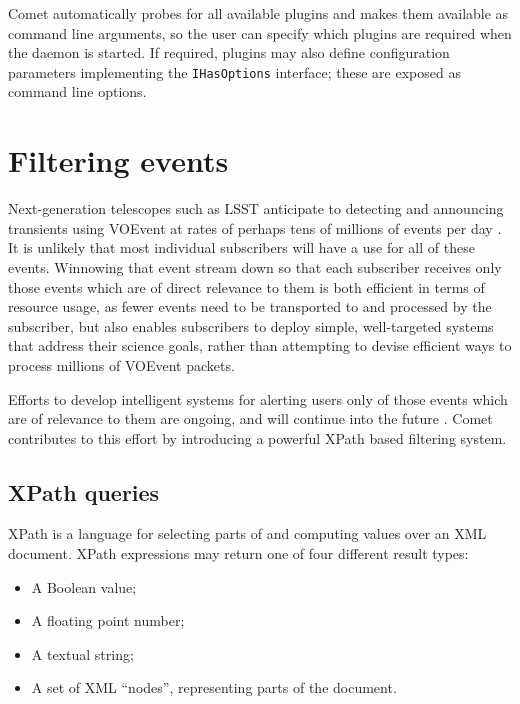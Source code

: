 \documentclass[5p,authoryear]{elsarticle}
\begin{document}
Comet automatically probes for all available plugins and makes them available
as command line arguments, so the user can specify which plugins are required
when the daemon is started. If required, plugins may also define configuration
parameters implementing the \texttt{IHasOptions} interface; these are exposed
as command line options.

\section{Filtering events}
\label{sec:filter}

Next-generation telescopes such as LSST anticipate to detecting and announcing
transients using VOEvent at rates of perhaps tens of millions of events per
day \citep{Kantor:2014}. It is unlikely that most individual subscribers will
have a use for all of these events. Winnowing that event stream down so that
each subscriber receives only those events which are of direct relevance to
them is both efficient in terms of resource usage, as fewer events need to be
transported to and processed by the subscriber, but also enables subscribers
to deploy simple, well-targeted systems that address their science goals,
rather than attempting to devise efficient ways to process millions of VOEvent
packets.

Efforts to develop intelligent systems for alerting users only of those events
which are of relevance to them are ongoing, and will continue into the future
\citep{Williams:2009}. Comet contributes to this effort by introducing a
powerful XPath \citep{Clark:1999} based filtering system.

\subsection{XPath queries}
\label{sec:filter:xpath}

\begingroup
{}
\setcounter{savelisting}{\value{listing}}%
\setcounter{listing}{0}
\renewcommand\listingscaption{XPath expression}

XPath is a language for selecting parts of and computing values over an XML
document. XPath expressions may return one of four different result types:

\begin{itemize}
  \item{A Boolean value;}
  \item{A floating point number;}
  \item{A textual string;}
  \item{A set of XML ``nodes'', representing parts of the document.}
\end{itemize}
\end{document}
